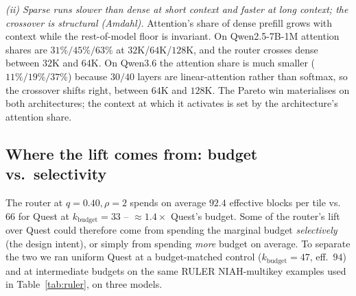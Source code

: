 \documentclass[11pt]{article}
\theoremstyle{remark}
\newcommand{\kbudget}{k_{\text{budget}}}
\begin{document}
\emph{(ii) Sparse runs slower than dense at short context and faster at long context; the crossover is structural (Amdahl).} Attention's share of dense prefill grows with context while the rest-of-model floor is invariant. On Qwen2.5-7B-1M attention shares are $31\% / 45\% / 63\%$ at $32$K/$64$K/$128$K, and the router crosses dense between $32$K and $64$K. On Qwen3.6 the attention share is much smaller ($11\% / 19\% / 37\%$) because $30/40$ layers are linear-attention rather than softmax, so the crossover shifts right, between $64$K and $128$K. The Pareto win materialises on both architectures; the context at which it activates is set by the architecture's attention share.

\subsection{Where the lift comes from: budget vs.\ selectivity}\label{sec:ablation}

The router at $q=0.40, \rho=2$ spends on average $92.4$ effective blocks per tile vs.\ $66$ for Quest at $\kbudget=33$ -- $\approx 1.4\times$ Quest's budget. Some of the router's lift over Quest could therefore come from spending the marginal budget \emph{selectively} (the design intent), or simply from spending \emph{more} budget on average. To separate the two we ran uniform Quest at a budget-matched control ($\kbudget=47$, eff.\ $94$) and at intermediate budgets on the same RULER NIAH-multikey examples used in Table~\ref{tab:ruler}, on three models.
\end{document}
